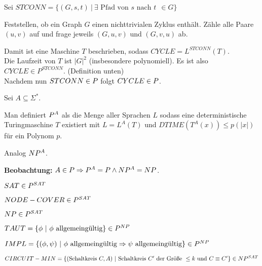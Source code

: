 \begin{beispiel}
    
    Sei $STCONN = \{ (G, s, t) \ |\  \exists \text{ Pfad von } s \text{ nach } t \ \ \in G \} $

    Feststellen, ob ein Graph $G$ einen nichttrivialen Zyklus enthält. Zähle alle Paare $(u,v)$ auf und frage jeweils $(G, u, v)$ und $(G, v, u)$ ab.

    Damit ist eine Maschine $T$ beschrieben, sodass $CYCLE = L^{STCONN}(T)$.\\
    Die Laufzeit von $T$ ist $|G|^2$ (insbesondere polynomiell). Es ist also $CYCLE \in P^{STCONN}$. (Definition unten)\\
    Nachdem nun $STCONN \in P$ folgt $CYCLE \in P$.

\end{beispiel}


\begin{definition}

    Sei $A \subseteq \Sigma^\ast$.

    Man definiert $P^A$ als die Menge aller Sprachen $L$ sodass eine deterministische Turingmaschine $T$ existiert mit $L = L^A(T)$ und $DTIME(T^A(x)) \leq p(|x|)$ für ein Polynom $p$.

    Analog $NP^A$.
    
\end{definition}

\textbf{Beobachtung:}
$A \in P \Rightarrow P^A = P \land NP^A = NP$.

    
\begin{beispiel}
    
    $SAT \in P^{SAT}$

    $NODE-COVER \in P^{SAT}$

    $NP \in P^{SAT}$


    $ TAUT = \{ \phi \ |\  \phi \text{ allgemeingültig} \} \in P^{NP}$


    $ IMPL = \{ (\phi, \psi) \ |\  \phi \text{ allgemeingültig} \Rightarrow \psi \text{ allgemeingültig} \} \in P^{NP} $


    $ CIRCUIT-MIN = \{  (\text{Schaltkreis } C,  A) \ | \ 
            \text{Schaltkreis } C' \text{ der Größe } \leq k \text{ und } C \equiv C' \}  \in \ComplexityClassNP^{SAT}$

\end{beispiel}



